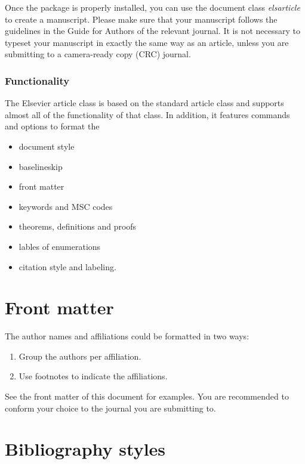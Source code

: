 \documentclass[]{elsarticle} %
\begin{document}
Once the package is properly installed, you can use the document class
\emph{elsarticle} to create a manuscript. Please make sure that your
manuscript follows the guidelines in the Guide for Authors of the
relevant journal. It is not necessary to typeset your manuscript in
exactly the same way as an article, unless you are submitting to a
camera-ready copy (CRC) journal.

\hypertarget{functionality}{%
\subsubsection{Functionality}\label{functionality}}

The Elsevier article class is based on the standard article class and
supports almost all of the functionality of that class. In addition, it
features commands and options to format the

\begin{itemize}
\item
  document style
\item
  baselineskip
\item
  front matter
\item
  keywords and MSC codes
\item
  theorems, definitions and proofs
\item
  lables of enumerations
\item
  citation style and labeling.
\end{itemize}

\hypertarget{front-matter}{%
\section{Front matter}\label{front-matter}}

The author names and affiliations could be formatted in two ways:

\begin{enumerate}
\def\labelenumi{(\arabic{enumi})}
\item
  Group the authors per affiliation.
\item
  Use footnotes to indicate the affiliations.
\end{enumerate}

See the front matter of this document for examples. You are recommended
to conform your choice to the journal you are submitting to.

\hypertarget{bibliography-styles}{%
\section{Bibliography styles}\label{bibliography-styles}}
\end{document}
